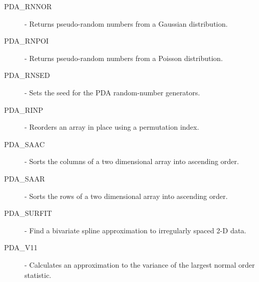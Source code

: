 \documentclass[11pt,twoside]{article}
\begin{document}
\begin{itemize}
\begin{description}
\item [PDA\_RNNOR] - Returns pseudo-random numbers from a Gaussian distribution.
\item [PDA\_RNPOI] - Returns pseudo-random numbers from a Poisson distribution.
\item [PDA\_RNSED] - Sets the seed for the PDA random-number generators.
\item [PDA\_RINP] - Reorders an array in place using a permutation index.
\item [PDA\_SAAC] - Sorts the columns of a two dimensional array into ascending order.
\item [PDA\_SAAR] - Sorts the rows of a two dimensional array into ascending order.
\item [PDA\_SURFIT] - Find a bivariate spline approximation to irregularly spaced 2-D data.
\item [PDA\_V11] - Calculates an approximation to the variance of the largest normal order statistic.

\end{description}
\end{itemize}


\sloppy\twocolumn

\end{document}
